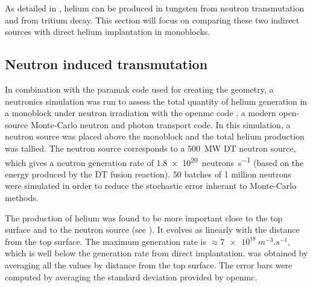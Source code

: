 As detailed in , helium can be produced in tungsten from neutron \gls{transmutation} and from tritium decay.
This section will focus on comparing these two indirect sources with direct helium implantation in monoblocks.

\subsection{Neutron induced transmutation}

In combination with the \gls{paramak} code  used for creating the geometry, a neutronics simulation was run to assess the total quantity of helium generation in a monoblock under neutron irradiation with the \gls{openmc} code , a modern open-source Monte-Carlo neutron and photon transport code.
In this simulation, a neutron source was placed above the monoblock and the total helium production was tallied.
The neutron source corresponds to a \SI{500}{MW} DT neutron source, which gives a neutron generation rate of \SI{1.8e20}{neutrons.s^{-1}} (based on the energy produced by the DT fusion reaction).
50 batches of 1 million neutrons were simulated in order to reduce the stochastic error inherant to Monte-Carlo methods.

The production of helium was found to be more important close to the top surface and to the neutron source (see ).
It evolves as linearly with the distance from the top surface.
The maximum generation rate is $\approx \SI{7e18}{m^{-3}.s^{-1}}$, which is well below the generation rate from direct implantation.
 was obtained by averaging all the values by distance from the top surface.
The error bars were computed by averaging the standard deviation provided by \gls{openmc}.

